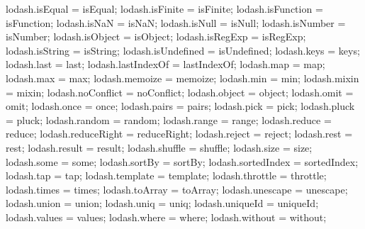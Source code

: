 \begin{DoxyCodeInclude}
{{\textcolor{stringliteral}{  lodash.isEqual = isEqual;}
\textcolor{stringliteral}{  lodash.isFinite = isFinite;}
\textcolor{stringliteral}{  lodash.isFunction = isFunction;}
\textcolor{stringliteral}{  lodash.isNaN = isNaN;}
\textcolor{stringliteral}{  lodash.isNull = isNull;}
\textcolor{stringliteral}{  lodash.isNumber = isNumber;}
\textcolor{stringliteral}{  lodash.isObject = isObject;}
\textcolor{stringliteral}{  lodash.isRegExp = isRegExp;}
\textcolor{stringliteral}{  lodash.isString = isString;}
\textcolor{stringliteral}{  lodash.isUndefined = isUndefined;}
\textcolor{stringliteral}{  lodash.keys = keys;}
\textcolor{stringliteral}{  lodash.last = last;}
\textcolor{stringliteral}{  lodash.lastIndexOf = lastIndexOf;}
\textcolor{stringliteral}{  lodash.map = map;}
\textcolor{stringliteral}{  lodash.max = max;}
\textcolor{stringliteral}{  lodash.memoize = memoize;}
\textcolor{stringliteral}{  lodash.min = min;}
\textcolor{stringliteral}{  lodash.mixin = mixin;}
\textcolor{stringliteral}{  lodash.noConflict = noConflict;}
\textcolor{stringliteral}{  lodash.object = object;}
\textcolor{stringliteral}{  lodash.omit = omit;}
\textcolor{stringliteral}{  lodash.once = once;}
\textcolor{stringliteral}{  lodash.pairs = pairs;}
\textcolor{stringliteral}{  lodash.pick = pick;}
\textcolor{stringliteral}{  lodash.pluck = pluck;}
\textcolor{stringliteral}{  lodash.random = random;}
\textcolor{stringliteral}{  lodash.range = range;}
\textcolor{stringliteral}{  lodash.reduce = reduce;}
\textcolor{stringliteral}{  lodash.reduceRight = reduceRight;}
\textcolor{stringliteral}{  lodash.reject = reject;}
\textcolor{stringliteral}{  lodash.rest = rest;}
\textcolor{stringliteral}{  lodash.result = result;}
\textcolor{stringliteral}{  lodash.shuffle = shuffle;}
\textcolor{stringliteral}{  lodash.size = size;}
\textcolor{stringliteral}{  lodash.some = some;}
\textcolor{stringliteral}{  lodash.sortBy = sortBy;}
\textcolor{stringliteral}{  lodash.sortedIndex = sortedIndex;}
\textcolor{stringliteral}{  lodash.tap = tap;}
\textcolor{stringliteral}{  lodash.template = template;}
\textcolor{stringliteral}{  lodash.throttle = throttle;}
\textcolor{stringliteral}{  lodash.times = times;}
\textcolor{stringliteral}{  lodash.toArray = toArray;}
\textcolor{stringliteral}{  lodash.unescape = unescape;}
\textcolor{stringliteral}{  lodash.union = union;}
\textcolor{stringliteral}{  lodash.uniq = uniq;}
\textcolor{stringliteral}{  lodash.uniqueId = uniqueId;}
\textcolor{stringliteral}{  lodash.values = values;}
\textcolor{stringliteral}{  lodash.where = where;}
\textcolor{stringliteral}{  lodash.without = without;}
}}
\end{DoxyCodeInclude}
